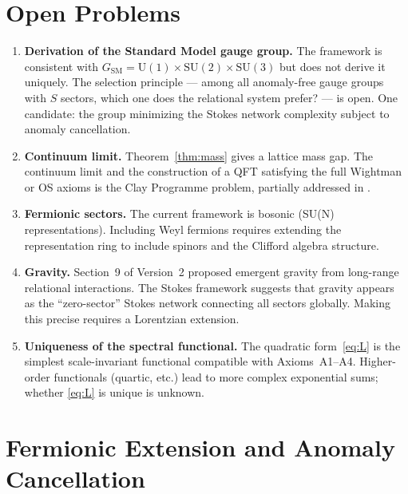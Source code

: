 \documentclass[12pt]{article}
\theoremstyle{definition}
\theoremstyle{remark}
\newcommand{\SU}{\mathrm{SU}}
\newcommand{\U}{\mathrm{U}}
\newcommand{\SM}{\mathrm{SM}}
\begin{document}
\section{Open Problems}
\label{sec:open}

\begin{enumerate}
\item \textbf{Derivation of the Standard Model gauge group.}
  The framework is consistent with $G_\SM = \U(1)\times\SU(2)\times\SU(3)$
  but does not derive it uniquely.  The selection principle — among all
  anomaly-free gauge groups with $S$ sectors, which one does the
  relational system prefer? --- is open.  One candidate: the group
  minimizing the Stokes network complexity subject to anomaly cancellation.

\item \textbf{Continuum limit.}
  Theorem~\ref{thm:mass} gives a lattice mass gap.  The continuum
  limit and the construction of a QFT satisfying the full Wightman
  or OS axioms is the Clay Programme problem, partially addressed
  in \cite{OlbrykMassGap2026}.

\item \textbf{Fermionic sectors.}
  The current framework is bosonic (SU(N) representations).
  Including Weyl fermions requires extending the representation ring
  to include spinors and the Clifford algebra structure.

\item \textbf{Gravity.}
  Section~9 of Version~2 proposed emergent gravity from long-range
  relational interactions.  The Stokes framework suggests that gravity
  appears as the ``zero-sector'' Stokes network connecting all sectors
  globally.  Making this precise requires a Lorentzian extension.

\item \textbf{Uniqueness of the spectral functional.}
  The quadratic form~\eqref{eq:L} is the simplest scale-invariant
  functional compatible with Axioms~A1--A4.  Higher-order functionals
  (quartic, etc.) lead to more complex exponential sums; whether
  \eqref{eq:L} is unique is unknown.
\end{enumerate}

\section{Fermionic Extension and Anomaly Cancellation}
\label{sec:fermions}
\end{document}
